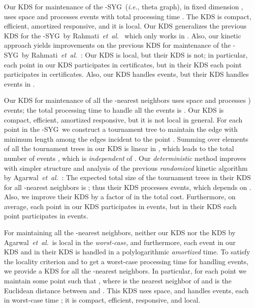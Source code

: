 \documentclass[preprint,12pt]{elsarticle}
\def\1syg{\mbox{-SYG}}
\newcommand{\etal}{\emph{et~al.}}
\newcommand{\ie}{\emph{i.e.}}
\begin{document}
Our KDS for maintenance of the \1syg~(\ie, theta graph), in fixed dimension , uses  space and processes  events with total processing time .  The KDS is compact, efficient, amortized responsive, and it is local. Our KDS generalizes the previous KDS for the \1syg~by Rahmati~\etal~\cite{Rahmati2014} which only works in . Also, our kinetic approach yields improvements on the previous KDS for maintenance of the \1syg~by Rahmati~\etal~\cite{Rahmati2014}: Our KDS is local, but their KDS is not;  in particular, each point in our KDS participates in  certificates, but in their KDS each point participates in  certificates. Also, our KDS handles  events, but their KDS handles  events in .

Our KDS for maintenance of all the -nearest neighbors uses  space and processes ) events; the total processing time to handle all the events is .  Our KDS is compact, efficient, amortized responsive, but it is not local in general. For each point  in the \1syg~we construct a tournament tree to maintain the edge with minimum length among the edges incident to the point . Summing over elements of all the tournament trees in our KDS is linear in , which leads to the total number of events , which is \textit{independent} of . Our \textit{deterministic} method improves with simpler structure and analysis of the previous \textit{randomized} kinetic algorithm by Agarwal~\etal~\cite{Agarwal:2008:KDD:1435375.1435379}: The expected total size of the tournament trees in their KDS for all -nearest neighbors is ; thus their KDS processes  events, which depends on . Also, we improve their KDS by a factor of  in the total cost. Furthermore, on average, each point in our KDS participates in  events, but in their KDS each point participates in  events.

For maintaining all the -nearest neighbors, neither our KDS nor the KDS by Agarwal~\etal~is local in the \textit{worst-case}, and furthermore, each event in our KDS and in their KDS is handled in a polylogarithmic \textit{amortized} time. To satisfy the locality criterion and to get a worst-case processing time for handling events, we provide a KDS for all the -nearest neighbors. In particular, for each point  we maintain some point  such that , where  is the nearest neighbor of  and  is the Euclidean distance between  and . This KDS uses  space, and handles  events, each in worst-case time ; it is compact, efficient, responsive, and local.
\end{document}
